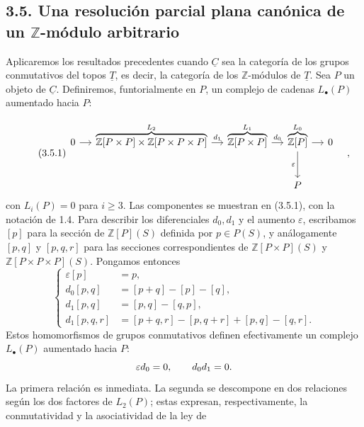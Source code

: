 \subsection*{3.5. Una resolución parcial plana canónica de un
$\mathbb Z$-módulo arbitrario}

Aplicaremos los resultados precedentes cuando $\underline C$ sea la
categoría de los grupos conmutativos del topos $\underline T$, es decir,
la categoría de los $\mathbb Z$-módulos de $\underline T$. Sea $P$ un
objeto de $\underline C$. Definiremos, funtorialmente en $P$, un complejo
de cadenas $L_\bullet(P)$ aumentado hacia $P$:


\begin{equation}\tag{3.5.1}
\begin{tikzcd}[column sep=small,row sep=large]
 0\arrow[r]&\overbrace{\mathbb Z[P\times P]\times
   \mathbb Z[P\times P\times P]}^{L_2}
   \arrow[r,"d_1"]
 &\overbrace{\mathbb Z[P\times P]}^{L_1}
   \arrow[r,"d_0"]
 &\overbrace{\mathbb Z[P]}^{L_0}
   \arrow[r]\arrow[d,"\varepsilon"']&0\\
 &&&P&{}
\end{tikzcd}\quad ,
\end{equation}
con $L_i(P)=0$ para $i\geq3$. Las componentes se muestran en (3.5.1),
con la notación de 1.4. Para describir los diferenciales $d_0,d_1$ y el
aumento $\varepsilon$, escribamos $[p]$ para la sección de
$\mathbb Z[P](S)$ definida por $p\in P(S)$, y análogamente $[p,q]$ y
$[p,q,r]$ para las secciones correspondientes de
$\mathbb Z[P\times P](S)$ y
$\mathbb Z[P\times P\times P](S)$. Pongamos entonces
\begin{equation}\tag{3.5.2}
\left\{
\begin{aligned}
 \varepsilon[p]&=p,\\
 d_0[p,q]&=[p+q]-[p]-[q],\\
 d_1[p,q]&=[p,q]-[q,p],\\
 d_1[p,q,r]&=[p+q,r]-[p,q+r]+[p,q]-[q,r].
\end{aligned}
\right.
\end{equation}
Estos homomorfismos de grupos conmutativos definen efectivamente un
complejo $L_\bullet(P)$ aumentado hacia $P$:
\[
 \varepsilon d_0=0,\qquad \sisi{d_1d_0}{d_0d_1}=0.
\]
La primera relación es inmediata. La segunda se descompone en dos
relaciones según los dos factores de $L_2(P)$; estas expresan,
respectivamente, la conmutatividad y la asociatividad de la ley de

